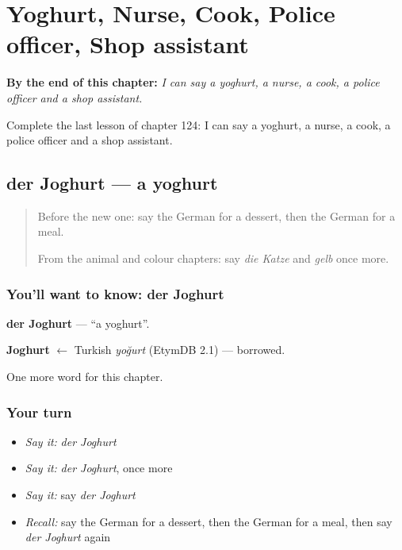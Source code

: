 
\chapter{Yoghurt, Nurse, Cook, Police officer, Shop assistant}
\label{ch:ge-yoghurt-nurse-cook-police-officer-shop-assistant}

\begin{chapteropening}
\textbf{By the end of this chapter:} \emph{I can say a yoghurt, a nurse, a cook, a police officer and a shop assistant.}

Complete the last lesson of chapter 124: I can say a yoghurt, a nurse, a cook, a police officer and a shop assistant.
\end{chapteropening}

\section[der Joghurt]{der Joghurt — a yoghurt}

\label{lesson:GE-C124-joghurt}



\begin{quote}
Before the new one: say the German for a dessert, then the German for a meal.

From the animal and colour chapters: say \emph{die Katze} and \emph{gelb} once more.
\end{quote}

\subsection*{You'll want to know: der Joghurt}
\textbf{der Joghurt} — \textquotedblleft{}a yoghurt\textquotedblright{}.

\begin{cousinweb}
\textbf{Joghurt} $\leftarrow$ Turkish \emph{yoğurt} (EtymDB 2.1) — borrowed.
\end{cousinweb}

\begin{grammarlens}[title={What you've built}]
One more word for this chapter.
\end{grammarlens}

\subsection*{Your turn}
\begin{itemize}
\raggedright
  \item \emph{Say it:} \emph{der Joghurt}
  \item \emph{Say it:} \emph{der Joghurt}, once more
  \item \emph{Say it:} say \emph{der Joghurt}
  \item \emph{Recall:} say the German for a dessert, then the German for a meal, then say \emph{der Joghurt} again
\end{itemize}


